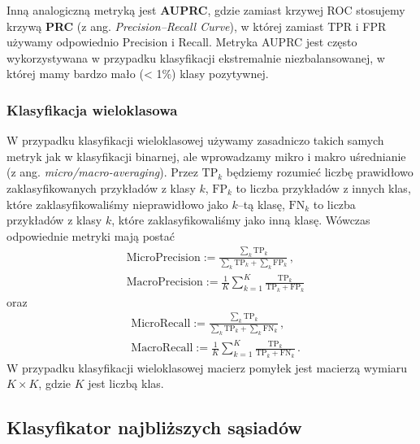 \documentclass{myclass}
\numberwithin{equation}{section}
\begin{document}
Inną analogiczną metryką jest \textbf{AUPRC}, gdzie zamiast krzywej ROC stosujemy krzywą
\textbf{PRC} (z ang. \textit{Precision--Recall Curve}), w której zamiast TPR i FPR używamy
odpowiednio Precision i Recall. Metryka AUPRC jest często wykorzystywana w przypadku klasyfikacji
ekstremalnie niezbalansowanej, w której mamy bardzo mało (< 1\%) klasy pozytywnej.


\subsubsection{Klasyfikacja wieloklasowa}

W przypadku klasyfikacji wieloklasowej używamy zasadniczo takich samych metryk jak w klasyfikacji
binarnej, ale wprowadzamy mikro i makro uśrednianie (z ang. \textit{micro/macro-averaging}). Przez
\(\mathrm{TP}_k\) będziemy rozumieć liczbę prawidłowo zaklasyfikowanych przykładów z klasy \(k\),
\(\mathrm{FP}_k\) to liczba przykładów z innych klas, które zaklasyfikowaliśmy nieprawidłowo jako
\(k\)--tą klasę, \(\mathrm{FN}_k\) to liczba przykładów z klasy \(k\), które zaklasyfikowaliśmy jako
inną klasę. Wówczas odpowiednie metryki mają postać
\begin{equation}
    \begin{split}
        &\mathrm{MicroPrecision} := \frac{\sum_{k} \mathrm{TP}_k}{\sum_{k} \mathrm{TP}_k + \sum_{k} \mathrm{FP}_k}\,,\\
        &\mathrm{MacroPrecision} := \frac{1}{K} \sum_{k=1}^K \frac{\mathrm{TP}_k}{\mathrm{TP}_k + \mathrm{FP}_k}
    \end{split}
\end{equation}
oraz
\begin{equation}
    \begin{split}
        &\mathrm{MicroRecall} := \frac{\sum_{k} \mathrm{TP}_k}{\sum_{k} \mathrm{TP}_k + \sum_{k} \mathrm{FN}_k}\,,\\
        &\mathrm{MacroRecall} := \frac{1}{K} \sum_{k=1}^K \frac{\mathrm{TP}_k}{\mathrm{TP}_k + \mathrm{FN}_k}\,.
    \end{split}
\end{equation}
W przypadku klasyfikacji wieloklasowej macierz pomyłek jest macierzą wymiaru \(K \times K\), gdzie
\(K\) jest liczbą klas.


\subsection{Klasyfikator najbliższych sąsiadów}
\end{document}
